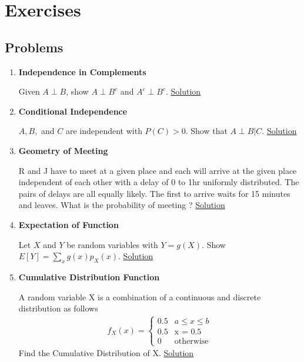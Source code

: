 \documentclass[11pt, a4paper]{article}
\begin{document}
    \section{Exercises}
    \subsection{Problems}
    \begin{enumerate}
    \item \hypertarget{q_indcomp}{\textbf{Independence in Complements}}\newline
    Given $A \perp B$, show $A \perp B^{c}$ and $A^{c} \perp B^{c}$. \hyperlink{a_indcomp}{Solution}

    \item \hypertarget{q_conind}{\textbf{Conditional Independence}}\newline
    $A,B,$ and $C$ are independent with $P(C) > 0$. Show that $A\perp B |C$. \hyperlink{a_conind}{Solution}

    \item \hypertarget{q_geomeet}{\textbf{Geometry of Meeting}}\newline
    R and J have to meet at a given place and each will arrive at the given place independent of each other with a delay of 0 to 1hr uniformly distributed. The pairs of delays are all equally likely. The first to arrive waits for 15 minutes and leaves. What is the probability of meeting ? \hyperlink{a_geomeet}{Solution}
    
    \item \hypertarget{q_expfn}{\textbf{Expectation of Function}}\newline
    Let $X$ and $Y$ be random variables with $Y = g(X)$. Show $E[Y] = \sum_{x}g(x)p_{X}(x)$. \hyperlink{a_expfn}{Solution}

    \item \hypertarget{q_cumuldistfn}{\textbf{Cumulative Distribution Function}}\newline
    A random variable X is a combination of a continuous and discrete distribution as follows
    \begin{align*}
        f_{X}(x) = \begin{cases} 0.5 &\mbox{$a \leq x \leq b$}\\
                                 0.5 &\mbox{x = 0.5}\\
                                 0 &\mbox{otherwise} \end{cases}
    \end{align*}
    Find the Cumulative Distribution of X. \hyperlink{a_cumuldistfn}{Solution}
    

\end{enumerate}
\end{document}

